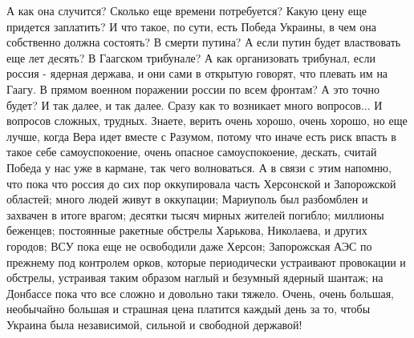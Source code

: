 А как она случится? Сколько еще времени потребуется?  Какую цену еще придется
заплатить? И что такое, по сути, есть Победа Украины, в чем она собственно
должна состоять?  В смерти путина? А если путин будет властвовать еще лет
десять? В Гаагском трибунале? А как организовать трибунал, если россия -
ядерная держава, и они сами в открытую говорят, что плевать им на Гаагу. В
прямом военном поражении россии по всем фронтам? А это точно будет? И так
далее, и так далее. Сразу как то возникает много вопросов...  И вопросов
сложных, трудных.  Знаете, верить очень хорошо, очень хорошо, но еще лучше,
когда Вера идет вместе с Разумом, потому что иначе есть риск впасть в такое
себе самоуспокоение, очень опасное самоуспокоение, дескать, считай Победа у нас
уже в кармане, так чего волноваться. А в связи с этим напомню, что пока что
россия до сих пор оккупировала часть Херсонской и Запорожской областей; много
людей живут в оккупации; Мариуполь был разбомблен и захвачен в итоге врагом;
десятки тысяч мирных жителей погибло; миллионы беженцев; постоянные ракетные
обстрелы Харькова, Николаева, и других городов; ВСУ пока еще не освободили даже
Херсон; Запорожская АЭС по прежнему под контролем орков, которые периодически
устраивают провокации и обстрелы, устраивая таким образом наглый и безумный
ядерный шантаж; на Донбассе пока что все сложно и довольно таки тяжело.  Очень,
очень большая, необычайно большая и страшная цена платится каждый день за то,
чтобы Украина была независимой, сильной и свободной державой!


